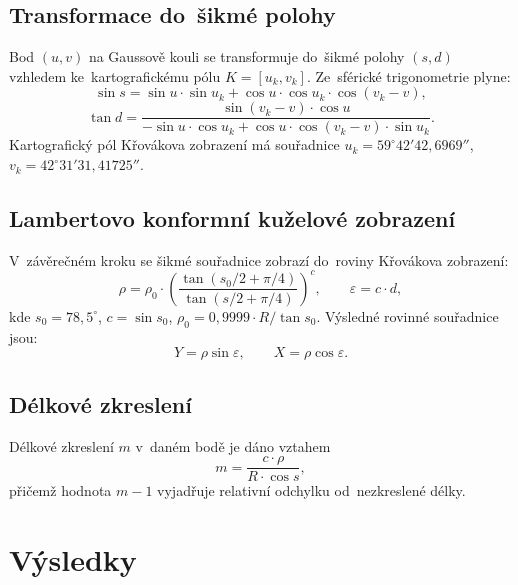 \documentclass[11pt, a4paper]{article}
\begin{document}
\subsection{Transformace do~šikmé polohy}

Bod $(u, v)$ na Gaussově kouli se transformuje do~šikmé polohy $(s, d)$ vzhledem ke~kartografickému pólu $K = [u_k, v_k]$. Ze~sférické trigonometrie plyne:
\begin{equation}
    \sin s = \sin u \cdot \sin u_k + \cos u \cdot \cos u_k \cdot \cos(v_k - v),
\end{equation}
\begin{equation}
    \tan d = \frac{\sin(v_k - v) \cdot \cos u}{-\sin u \cdot \cos u_k + \cos u \cdot \cos(v_k - v) \cdot \sin u_k}.
\end{equation}
Kartografický pól Křovákova zobrazení má souřadnice $u_k = 59^{\circ}42'42{,}6969''$, $v_k = 42^{\circ}31'31{,}41725''$.

\subsection{Lambertovo konformní kuželové zobrazení}

V~závěrečném kroku se šikmé souřadnice zobrazí do~roviny Křovákova zobrazení:
\begin{equation}
    \rho = \rho_0 \cdot \left(\frac{\tan(s_0/2 + \pi/4)}{\tan(s/2 + \pi/4)}\right)^c, \qquad
    \varepsilon = c \cdot d,
\end{equation}
kde $s_0 = 78{,}5^{\circ}$, $c = \sin s_0$, $\rho_0 = 0{,}9999 \cdot R / \tan s_0$. Výsledné rovinné souřadnice jsou:
\begin{equation}
    Y = \rho \sin\varepsilon, \qquad X = \rho \cos\varepsilon.
\end{equation}

\subsection{Délkové zkreslení}

Délkové zkreslení $m$ v~daném bodě je dáno vztahem
\begin{equation}
    m = \frac{c \cdot \rho}{R \cdot \cos s},
\end{equation}
přičemž hodnota $m-1$ vyjadřuje relativní odchylku od~nezkreslené délky.

\newpage

\section{Výsledky}
\end{document}

